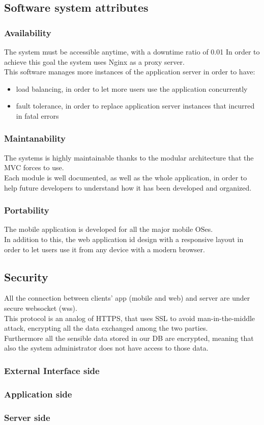\subsection{Software system attributes}

\subsubsection{Availability}
The system must be accessible anytime, with a downtime ratio of 0.01 %
In order to achieve this goal the system uses Nginx as a proxy server.\\
This software manages more instances of the application server in order to have:
\begin{itemize}
\item load balancing, in order to let more users use the application concurrently
\item fault tolerance, in order to replace application server instances that incurred in fatal errors
\end{itemize}
\subsubsection{Maintanability}
The systems is highly maintainable thanks to the modular architecture that the MVC forces to use.\\
Each module is well documented, as well as the whole application, in order to help future developers to understand how it has been developed and organized.

\subsubsection{Portability}
The mobile application is developed for all the major mobile OSes.\\
In addition to this, the web application id design with a responsive layout in order to let users use it from any device with a modern browser.

\subsection{Security}
All the connection between clients’ app (mobile and web) and server are under secure websocket (wss).\\
This protocol is an analog of HTTPS, that uses SSL to avoid man-in-the-middle attack, encrypting all the data exchanged among the two parties.\\
Furthermore all the sensible data stored in our DB are encrypted, meaning that also the system administrator does not have access to those data.

\subsubsection{External Interface side}

\subsubsection{Application side}

\subsubsection{Server side}